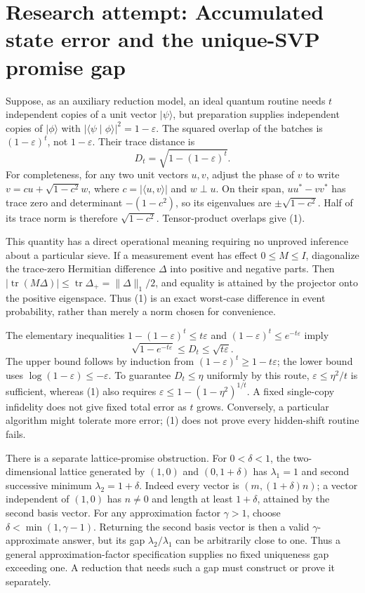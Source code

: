 \documentclass[11pt]{article}
\begin{document}
\section{Research attempt: Accumulated state error and the unique-SVP promise gap}
Suppose, as an auxiliary reduction model, an ideal quantum routine needs $t$ independent copies of a unit vector $|\psi\rangle$, but preparation supplies independent copies of $|\phi\rangle$ with
$|\langle\psi\mid\phi\rangle|^2=1-\varepsilon$. The squared overlap of the batches is $(1-\varepsilon)^t$, not $1-\varepsilon$. Their trace distance is
\[
 D_t=\sqrt{1-(1-\varepsilon)^t}.                 \tag{1}
\]
For completeness, for any two unit vectors $u,v$, adjust the phase of $v$ to write $v=cu+\sqrt{1-c^2}w$, where $c=|\langle u,v\rangle|$ and $w\perp u$. On their span, $uu^*-vv^*$ has trace zero and determinant $-(1-c^2)$, so its eigenvalues are $\pm\sqrt{1-c^2}$. Half of its trace norm is therefore $\sqrt{1-c^2}$. Tensor-product overlaps give (1).

This quantity has a direct operational meaning requiring no unproved inference about a particular sieve. If a measurement event has effect $0\leq M\leq I$, diagonalize the trace-zero Hermitian difference $\Delta$ into positive and negative parts. Then $|\operatorname{tr}(M\Delta)|\leq\operatorname{tr}\Delta_+=\|\Delta\|_1/2$, and equality is attained by the projector onto the positive eigenspace. Thus (1) is an exact worst-case difference in event probability, rather than merely a norm chosen for convenience.

The elementary inequalities $1-(1-\varepsilon)^t\leq t\varepsilon$ and $(1-\varepsilon)^t\leq e^{-t\varepsilon}$ imply
\[
 \sqrt{1-e^{-t\varepsilon}}\leq D_t\leq\sqrt{t\varepsilon}.
\]
The upper bound follows by induction from $(1-\varepsilon)^t\geq1-t\varepsilon$; the lower bound uses $\log(1-\varepsilon)\leq-\varepsilon$. To guarantee $D_t\leq\eta$ uniformly by this route, $\varepsilon\leq\eta^2/t$ is sufficient, whereas (1) also requires $\varepsilon\leq1-(1-\eta^2)^{1/t}$. A fixed single-copy infidelity does not give fixed total error as $t$ grows. Conversely, a particular algorithm might tolerate more error; (1) does not prove every hidden-shift routine fails.

There is a separate lattice-promise obstruction. For $0<\delta<1$, the two-dimensional lattice generated by $(1,0)$ and $(0,1+\delta)$ has $\lambda_1=1$ and second successive minimum $\lambda_2=1+\delta$. Indeed every vector is $(m,(1+\delta)n)$; a vector independent of $(1,0)$ has $n\ne0$ and length at least $1+\delta$, attained by the second basis vector. For any approximation factor $\gamma>1$, choose $\delta<\min(1,\gamma-1)$. Returning the second basis vector is then a valid $\gamma$-approximate answer, but its gap $\lambda_2/\lambda_1$ can be arbitrarily close to one. Thus a general approximation-factor specification supplies no fixed uniqueness gap exceeding one. A reduction that needs such a gap must construct or prove it separately.
\end{document}
